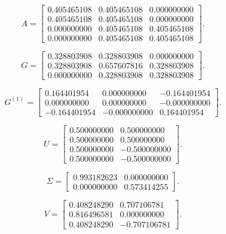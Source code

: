 \noindent\begin{minipage}[t]{.48\textwidth}\footnotesize\setlength{\arraycolsep}{3pt}\[ A=\begin{bmatrix}0.405465108 & 0.405465108 & 0.000000000\\0.405465108 & 0.405465108 & 0.000000000\\0.000000000 & 0.405465108 & 0.405465108\\0.000000000 & 0.405465108 & 0.405465108\end{bmatrix}. \]
\end{minipage}\hfill\begin{minipage}[t]{.48\textwidth}\footnotesize\setlength{\arraycolsep}{3pt}\[ G=\begin{bmatrix}0.328803908 & 0.328803908 & 0.000000000\\0.328803908 & 0.657607816 & 0.328803908\\0.000000000 & 0.328803908 & 0.328803908\end{bmatrix}. \]
\end{minipage}\par
\noindent\begin{minipage}[t]{.48\textwidth}\footnotesize\setlength{\arraycolsep}{3pt}\[ G^{(1)}=\begin{bmatrix}0.164401954 & 0.000000000 & -0.164401954\\0.000000000 & 0.000000000 & -0.000000000\\-0.164401954 & -0.000000000 & 0.164401954\end{bmatrix}. \]
\end{minipage}\hfill\begin{minipage}[t]{.48\textwidth}\footnotesize\setlength{\arraycolsep}{3pt}\[ U=\begin{bmatrix}0.500000000 & 0.500000000\\0.500000000 & 0.500000000\\0.500000000 & -0.500000000\\0.500000000 & -0.500000000\end{bmatrix}. \]
\end{minipage}\par
\noindent\begin{minipage}[t]{.48\textwidth}\footnotesize\setlength{\arraycolsep}{3pt}\[ \Sigma=\begin{bmatrix}0.993182623 & 0.000000000\\0.000000000 & 0.573414255\end{bmatrix}. \]
\end{minipage}\hfill\begin{minipage}[t]{.48\textwidth}\footnotesize\setlength{\arraycolsep}{3pt}\[ V=\begin{bmatrix}0.408248290 & 0.707106781\\0.816496581 & 0.000000000\\0.408248290 & -0.707106781\end{bmatrix}. \]
\end{minipage}\par
